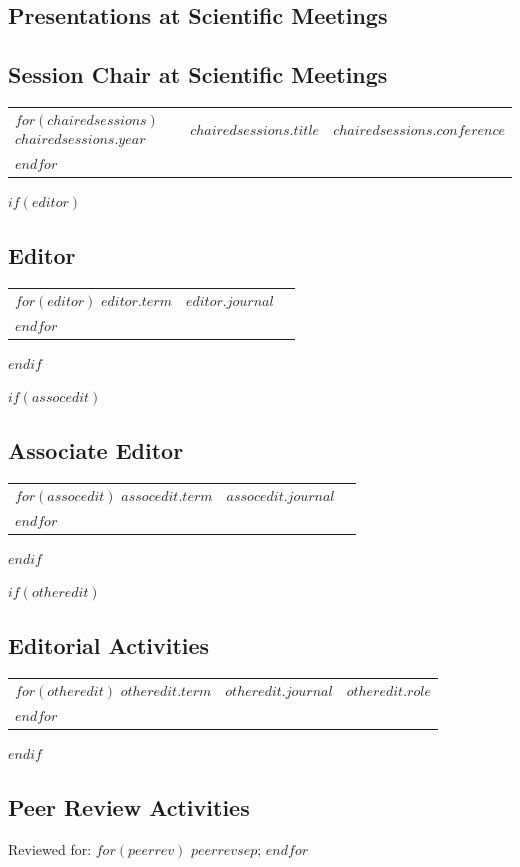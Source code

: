 \documentclass[martgin, line, 11pt]{article}
\begin{document}
\subsection*{Presentations at Scientific Meetings}

\begin{enumerate}
  
\end{enumerate}

\subsection*{Session Chair at Scientific Meetings}

\setlength{\extrarowheight}{.25em}
\begin{longtable}[l]{lll}
  $for(chairedsessions)$
  $chairedsessions.year$&
  $chairedsessions.title$&
  $chairedsessions.conference$\\
  $endfor$
\end{longtable}
\setlength{\extrarowheight}{0em}

$if(editor)$
\subsection*{Editor}
\begin{tabular}{lll}
$for(editor)$
$editor.term$&
$editor.journal$
\\
$endfor$
\end{tabular}
$endif$

$if(assocedit)$
\subsection*{Associate Editor}
\begin{tabular}{lll}
$for(assocedit)$
$assocedit.term$&
$assocedit.journal$
\\
$endfor$
\end{tabular}
$endif$

$if(otheredit)$
\subsection*{Editorial Activities}
\begin{tabular}{lll}
$for(otheredit)$
$otheredit.term$&
$otheredit.journal$&
$otheredit.role$
\\
$endfor$
\end{tabular}
$endif$

\subsection*{Peer Review Activities}
Reviewed for:
$for(peerrev)$
$peerrev$$sep$;
$endfor$
\end{document}
